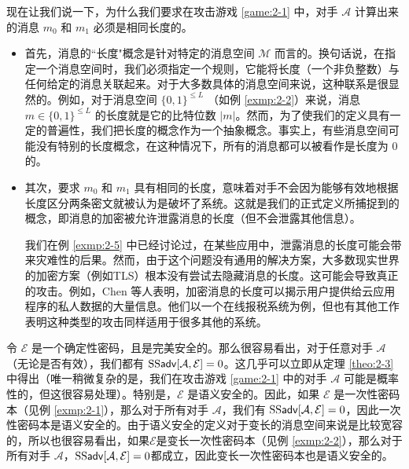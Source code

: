 \begin{remark}
现在让我们说一下，为什么我们要求在攻击游戏 \ref{game:2-1} 中，对手 $\mathcal{A}$ 计算出来的消息 $m_0$ 和 $m_1$ 必须是相同长度的。
\begin{itemize}
	\item 首先，消息的``长度"概念是针对特定的消息空间 $\mathcal{M}$ 而言的。换句话说，在指定一个消息空间时，我们必须指定一个规则，它能将长度（一个非负整数）与任何给定的消息关联起来。对于大多数具体的消息空间来说，这种联系是很显然的。例如，对于消息空间 $\{0, 1\}^{\leq L}$ （如例 \ref{exmp:2-2}）来说，消息 $m\in\{0, 1\}^{\leq L}$ 的长度就是它的比特位数 $|m|$。然而，为了使我们的定义具有一定的普遍性，我们把长度的概念作为一个抽象概念。事实上，有些消息空间可能没有特别的长度概念，在这种情况下，所有的消息都可以被看作是长度为 $0$ 的。
	\item 其次，要求 $m_0$ 和 $m_1$ 具有相同的长度，意味着对手不会因为能够有效地根据长度区分两条密文就被认为是破坏了系统。这就是我们的正式定义所捕捉到的概念，即消息的加密被允许泄露消息的长度（但不会泄露其他信息）。
		
	我们在例 \ref{exmp:2-5} 中已经讨论过，在某些应用中，泄露消息的长度可能会带来灾难性的后果。然而，由于这个问题没有通用的解决方案，大多数现实世界的加密方案（例如TLS）根本没有尝试去隐藏消息的长度。这可能会导致真正的攻击。例如，Chen 等人表明，加密消息的长度可以揭示用户提供给云应用程序的私人数据的大量信息。他们以一个在线报税系统为例，但也有其他工作表明这种类型的攻击同样适用于很多其他的系统。
\end{itemize}
\end{remark}

\begin{example}\label{exmp:2-9}
令 $\mathcal{E}$ 是一个确定性密码，且是完美安全的。那么很容易看出，对于任意对手 $\mathcal{A}$（无论是否有效），我们都有 ${\rm SS\mathsf{adv}}[\mathcal{A},\mathcal{E}]=0$。这几乎可以立即从定理 \ref{theo:2-3} 中得出（唯一稍微复杂的是，我们在攻击游戏 \ref{game:2-1} 中的对手 $\mathcal{A}$ 可能是概率性的，但这很容易处理）。特别是，$\mathcal{E}$ 是语义安全的。因此，如果 $\mathcal{E}$ 是一次性密码本（见例 \ref{exmp:2-1}），那么对于所有对手 $\mathcal{A}$，我们有 ${\rm SS\mathsf{adv}}[\mathcal{A},\mathcal{E}]=0$，因此一次性密码本是语义安全的。由于语义安全的定义对于变长的消息空间来说是比较宽容的，所以也很容易看出，如果$\mathcal{E}$是变长一次性密码本（见例 \ref{exmp:2-2}），那么对于所有对手 $\mathcal{A}$，${\rm SS\mathsf{adv}}[\mathcal{A},\mathcal{E}]=0$都成立，因此变长一次性密码本也是语义安全的。
\end{example}

